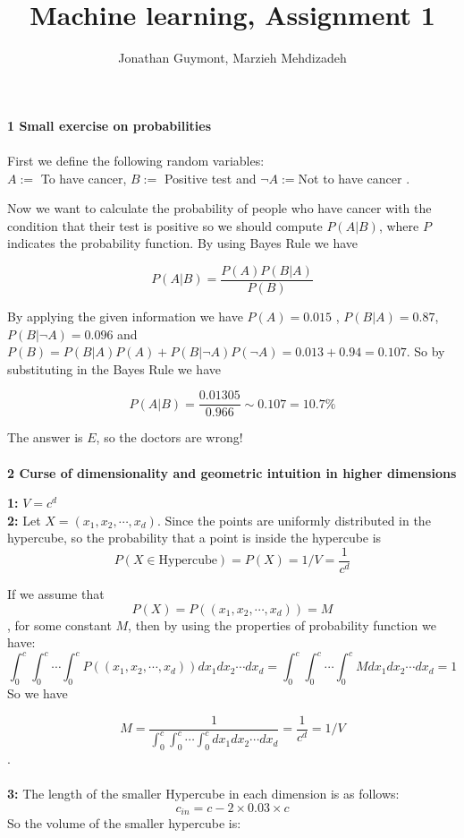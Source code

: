 \documentclass[12pt,english]{amsart}
\title{Machine learning, Assignment 1}
\author{ Jonathan Guymont, Marzieh Mehdizadeh}
\date{}
\theoremstyle{definition}
\begin{document}
\maketitle

\textbf{1 Small exercise on probabilities}\\\\

First we define the following random variables:\\
$A:=$ To have cancer, $B:=$ Positive test and $\neg A:= $Not to have cancer .

Now we want to calculate the probability of people who have cancer with the condition that their test is positive so we should compute $P(A|B)$, where $P$ indicates the probability function. By using Bayes Rule we have

$$P(A|B)= \frac{P(A) P(B|A)}{P(B)}$$

By applying the given information we have
$P(A)= 0.015$ , $P(B|A)=0.87$, $P(B|\neg A)= 0.096$ and 
 $P(B)= P(B|A)P(A)+P(B| \neg A)P(\neg A)= 0.013+0.94= 0.107 $. So by substituting in the Bayes Rule we have
 
 $$ P(A|B)= \frac{0.01305}{0.966} \sim 0.107= 10.7 \%$$
 
The answer is $E$, so the doctors are wrong! \\\\

\textbf{2 Curse of dimensionality and geometric intuition
in higher dimensions}


\textbf{1:} $V= c^d$\\

\textbf{2:} Let $X=(x_1, x_2, \cdots, x_d)$. Since the points are uniformly distributed in the hypercube, so the probability that a point is inside the hypercube is $$P(X\in \text{Hypercube})=P(X)=1/V= \frac{1}{c^d}$$

If we assume that $$P(X)= P((x_1, x_2,\cdots, x_d))= M $$, for some constant $M$, then by using the properties of probability function we have:
$$\int_{0}^{c}\int_{0}^{c}\cdots \int_{0}^{c} P((x_1, x_2,\cdots, x_d)) dx_1 dx_2 \cdots dx_d= \int_{0}^{c}\int_{0}^{c}\cdots \int_{0}^{c} M dx_1 dx_2 \cdots dx_d=1$$
So we have

$$M= \frac{1}{\int_{0}^{c}\int_{0}^{c}\cdots \int_{0}^{c}  dx_1 dx_2 \cdots dx_d} = \frac{1}{c^d} = 1/V$$.\\\\
\textbf{3:}  The length of the smaller Hypercube in each dimension is as follows:
$$c_{in}  = c- 2\times 0.03 \times c$$ 
So the volume of the smaller hypercube is:
\end{document}
